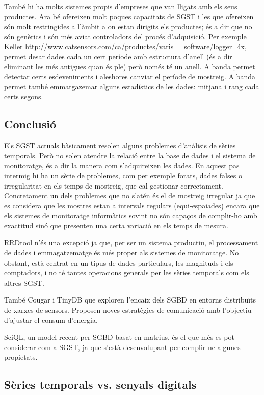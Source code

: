 \todo{} També hi ha molts sistemes propis d'empreses que van lligats
amb els seus productes. Ara bé ofereixen molt poques capacitats de
SGST i les que ofereixen són molt restringides a l'àmbit a on estan
dirigits els productes; és a dir que no són genèrics i són més aviat
controladors del procés d'adquisició. Per exemple Keller
\url{http://www.catsensors.com/ca/productes/varis__software/logger_4x}, permet desar dades cada un cert període amb estructura d'anell (és a dir eliminant les més antigues quan és ple) però només té un anell. A banda permet detectar certs esdeveniments i aleshores canviar el període de mostreig. A banda permet també emmatgazemar alguns estadístics de les dades: mitjana i rang cada certs segons.


\subsection{Conclusió}

Els SGST actuals bàsicament resolen alguns problemes d'anàlisis de sèries temporals.
Però no solen atendre la relació entre la base de dades i el sistema de monitoratge, és a dir la manera com s'adquireixen les dades. En aquest pas intermig hi ha un sèrie de problemes, com per exemple forats, dades falses o irregularitat en els temps de mostreig, que cal gestionar correctament. Concretament un dels problemes que no s'atén és el de mostreig irregular ja que es considera que les mostres estan a intervals regulars (equi-espaiades) encara que els sistemes de monitoratge informàtics sovint no són capaços de complir-ho amb exactitud sinó que presenten una certa variació en els temps de mesura. 

RRDtool n'és una excepció ja que, per ser un sistema productiu, el processament de dades i emmagatzematge és més proper als sistemes de monitoratge. No obstant, està centrat en un tipus de dades particulars, les magnituds i els comptadors, i no té tantes operacions generals per les sèries temporals com els altres SGST.

També Cougar i TinyDB que exploren l'encaix dels SGBD en entorns distribuïts de xarxes de sensors. Proposen noves estratègies de comunicació amb l'objectiu d'ajustar el consum d'energia. 


SciQL, un model recent per SGBD  basat en matrius, és el que més es pot considerar com a SGST, ja que s'està desenvolupant per complir-ne algunes propietats.




\subsection{Sèries temporals vs. senyals digitals}
\todo{}

